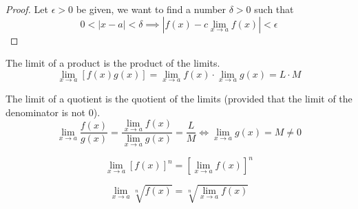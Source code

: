 \begin{proof}
    Let \(\epsilon>0\) be given, we want to find a number \(\delta>0\) such
    that \[0<|x-a|<\delta\implies|f(x)-c\lim_{x\to a}f(x)|<\epsilon\]
\end{proof}
\begin{theorem}
    The limit of a product is the product of the limits.
    \[\lim_{x\to a}[f(x)g(x)]=\lim_{x\to a}f(x)\cdot\lim_{x\to a}g(x)=L\cdot M\]
\end{theorem}
\begin{theorem}
    The limit of a quotient is the quotient of the limits (provided that the
    limit of the denominator is not 0).
    \[\lim_{x\to a}\frac{f(x)}{g(x)}=\frac{\lim_{x\to a}f(x)}{\lim_{x\to a}g(x)}
    =\frac{L}{M}\iff\lim_{x\to a}g(x)=M\neq0\]
\end{theorem}
\begin{theorem}
    \[\lim_{x\to a}[f(x)]^n = [\lim_{x\to a}f(x)]^n\]
\end{theorem}
\begin{theorem}
    \[\lim_{x\to a}\sqrt[n]{f(x)} = \sqrt[n]{\lim_{x\to a}f(x)}\]
\end{theorem}
